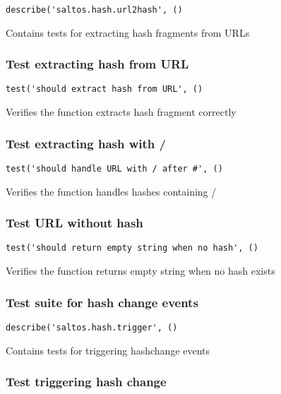 \documentclass[a4paper]{article}
\begin{document}
\begin{lstlisting}
describe('saltos.hash.url2hash', ()
\end{lstlisting}

Contains tests for extracting hash fragments from URLs

\hypertarget{toc652}{}
\subsubsection{Test extracting hash from URL}

\begin{lstlisting}
test('should extract hash from URL', ()
\end{lstlisting}

Verifies the function extracts hash fragment correctly

\hypertarget{toc653}{}
\subsubsection{Test extracting hash with /}

\begin{lstlisting}
test('should handle URL with / after #', ()
\end{lstlisting}

Verifies the function handles hashes containing /

\hypertarget{toc654}{}
\subsubsection{Test URL without hash}

\begin{lstlisting}
test('should return empty string when no hash', ()
\end{lstlisting}

Verifies the function returns empty string when no hash exists

\hypertarget{toc655}{}
\subsubsection{Test suite for hash change events}

\begin{lstlisting}
describe('saltos.hash.trigger', ()
\end{lstlisting}

Contains tests for triggering hashchange events

\hypertarget{toc656}{}
\subsubsection{Test triggering hash change}
\end{document}
